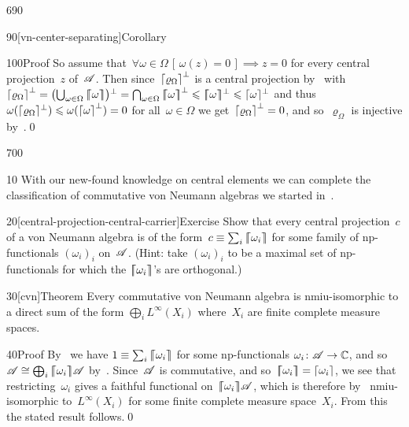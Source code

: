 \begin{parsec}{690}
\begin{point}{90}[vn-center-separating]{Corollary}
\begin{point}{100}{Proof}
So assume that~$\forall \omega\in\Omega\,[\,\omega(z)=0\,]\implies z=0$ 
for every central projection~$z$
of~$\mathscr{A}$.
Then since~$\left\lceil\varrho_\Omega\right\rceil^\perp$
is a central projection
by~
with
$\ceil{\varrho_\Omega}^\perp
=\smash{\bigl(\bigcup_{\omega\in\Omega} \smash{\cceil{\omega}\bigr)}}^\perp
=\bigcap_{\omega\in \Omega} \cceil{\omega}^\perp
\leq \smash{\cceil{\omega}}^\perp
\leq \smash{\ceil{\omega}}^\perp$
and thus
$\omega(\smash{\left\lceil\varrho_\Omega\right\rceil}^\perp)
\leqslant \omega(\left\lceil\omega\right\rceil^\perp)=0$
for all~$\omega\in\Omega$
we get~$\left\lceil\varrho_\Omega\right\rceil^\perp =0$,
and so~$\varrho_\Omega$ is injective
by~.\qed
\end{point}
\end{point}
\end{parsec}
\begin{parsec}{700}%
\begin{point}{10}%
With our new-found knowledge on central elements
we can complete the classification
of commutative von Neumann algebras
we started in~.
\end{point}
\begin{point}{20}[central-projection-central-carrier]{Exercise}%
Show that every central projection~$c$
of a von Neumann algebra is of
the form~$c\equiv \sum_i \left\lceil\!\!\left\lceil\omega_i\right\rceil\!\!\right\rceil$
for some family of np-functionals $(\omega_i)_i$ on~$\mathscr{A}$.
(Hint: take
    $(\omega_i)_i$ to be a maximal set
    of np-functionals for which the $\left\lceil\!\!\left\lceil\omega_i\right\rceil\!\!\right\rceil$'s are orthogonal.)
\end{point}
\begin{point}{30}[cvn]{Theorem}%
Every commutative von Neumann algebra
is nmiu-isomorphic
to a direct sum of the form  $\bigoplus_i L^\infty(X_i)$
where~$X_i$ are finite complete measure spaces.
\begin{point}{40}{Proof}%
By~
we have $1\equiv \sum_i \left\lceil\!\!\left\lceil\omega_i\right\rceil\!\!\right\rceil $
for some np-functionals $\omega_i\colon \mathscr{A}\to\mathbb{C}$,
and so~$\mathscr{A}\cong \bigoplus_i \left\lceil\!\!\left\lceil\omega_i\right\rceil\!\!\right\rceil\!\mathscr{A}$
by~.
Since~$\mathscr{A}$ is commutative,
and so~$\left\lceil\!\!\left\lceil\omega_i\right\rceil\!\!\right\rceil=\left\lceil\omega_i\right\rceil$,
we see that restricting~$\omega_i$
gives a faithful functional on~$\left\lceil\!\!\left\lceil\omega_i\right\rceil\!\!\right\rceil\!\mathscr{A}$,
which is therefore by~ nmiu-isomorphic to~$L^\infty(X_i)$
for some finite complete measure space~$X_i$.
From this the stated result follows.\qed
\end{point}
\end{point}
\end{parsec}

